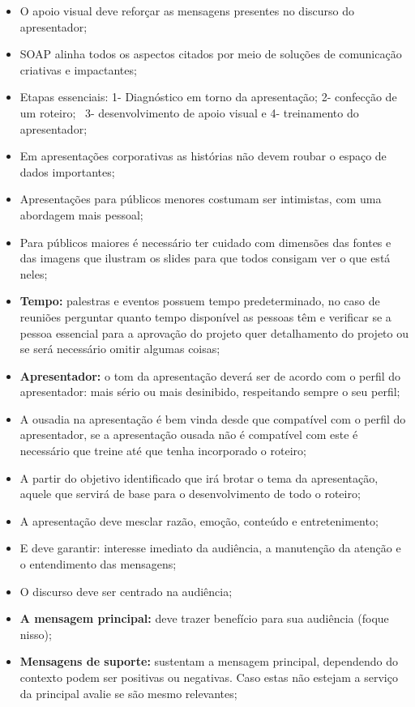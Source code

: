 \begin{itemize}
    \item O apoio visual deve reforçar as mensagens presentes no discurso do apresentador;
    \item SOAP alinha todos os aspectos citados por meio de soluções de comunicação criativas e impactantes;
    \item Etapas essenciais: 1- Diagnóstico em torno da apresentação; 2- confecção de um roteiro;  3- desenvolvimento de apoio visual e 4- treinamento do apresentador;
    \item Em apresentações corporativas as histórias não devem roubar o espaço de dados importantes;
    \item Apresentações para públicos menores costumam ser intimistas, com uma abordagem mais pessoal;
    \item Para públicos maiores é necessário ter cuidado com dimensões das fontes e das imagens que ilustram os slides para que todos consigam ver o que está neles;
    \item \textbf{Tempo:} palestras e eventos possuem tempo predeterminado, no caso de reuniões perguntar quanto tempo disponível as pessoas têm e verificar se a pessoa essencial para a aprovação do projeto quer detalhamento do projeto ou se será necessário omitir algumas coisas;
    \item \textbf{Apresentador:} o tom da apresentação deverá ser de acordo com o perfil do apresentador: mais sério ou mais desinibido, respeitando sempre o seu perfil;
    \item A ousadia na apresentação é bem vinda desde que compatível com o perfil do apresentador, se a apresentação ousada não é compatível com este é necessário que treine até que tenha incorporado o roteiro;
    \item A partir do objetivo identificado que irá brotar o tema da apresentação, aquele que servirá de base para o desenvolvimento de todo o roteiro;
    \item A apresentação deve mesclar razão, emoção, conteúdo e entretenimento;
    \item E deve garantir: interesse imediato da audiência, a manutenção da atenção e o entendimento das mensagens;
    \item O discurso deve ser centrado na audiência;
    \item \textbf{A mensagem principal:} deve trazer benefício para sua audiência (foque nisso);
    \item \textbf{Mensagens de suporte:} sustentam a mensagem principal, dependendo do contexto podem ser positivas ou negativas. Caso estas não estejam a serviço da principal avalie se são mesmo relevantes;

\end{itemize}

